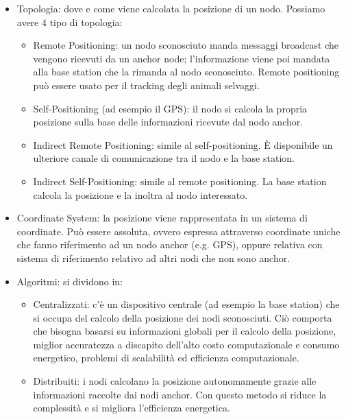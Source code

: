 \begin{itemize}
    \item Topologia: dove e come viene calcolata la posizione di un
    nodo. Possiamo avere 4 tipo di topologia:
    \begin{itemize}
        \item Remote Positioning: un nodo sconosciuto
        manda messaggi broadcast che vengono ricevuti da un anchor node; l'informazione
        viene poi mandata alla base station che la rimanda al nodo sconosciuto. Remote
        positioning può essere usato per il tracking degli animali selvaggi.
        \item Self-Positioning (ad esempio il GPS): il
        nodo si calcola la propria posizione sulla base delle informazioni ricevute dal
        nodo anchor.
        \item Indirect Remote Positioning: simile al
        self-positioning. È disponibile un ulteriore canale di comunicazione tra il nodo
        e la base station.
        \item Indirect Self-Positioning: simile al
        remote positioning. La base station calcola la posizione e la inoltra al nodo
        interessato.
    \end{itemize}
    \item Coordinate System: la posizione viene rappresentata in un
    sistema di coordinate. Può essere assoluta, ovvero espressa attraverso
    coordinate uniche che fanno riferimento ad un nodo anchor (e.g. GPS), oppure
    relativa con sistema di riferimento relativo ad altri nodi che non sono anchor.
    \item Algoritmi: si dividono in:
    \begin{itemize}
        \item Centralizzati: c'è un dispositivo centrale (ad
        esempio la base station) che si occupa del calcolo della posizione dei nodi
        sconosciuti. Ciò comporta che bisogna basarsi su informazioni globali per il
        calcolo della posizione, miglior accuratezza a discapito dell'alto costo
        computazionale e consumo energetico, problemi di scalabilità ed efficienza
        computazionale.
        \item Distribuiti: i nodi calcolano la posizione
        autonomamente grazie alle informazioni raccolte dai nodi anchor. Con questo
        metodo si riduce la complessità e si migliora l'efficienza energetica.
    \end{itemize}


\end{itemize}

